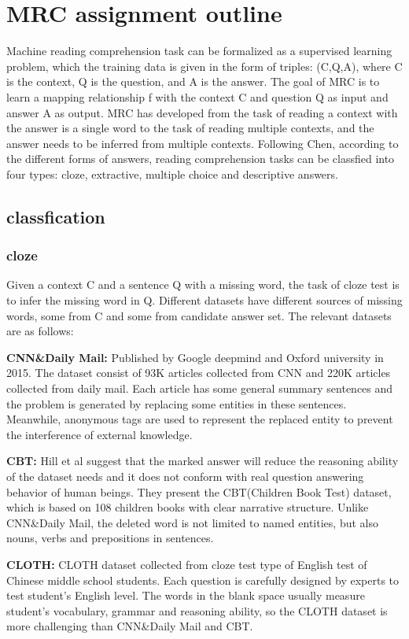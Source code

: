 \section{MRC assignment outline}
Machine reading comprehension task can be formalized as a supervised learning problem, which the training data 
is given in the form of triples: (C,Q,A), where C is the context, Q is the question, and A is the answer. 
The goal of MRC is to learn a mapping relationship f with the context C and question Q as input and answer A as output. 
MRC has developed from the task of reading a context with the answer is a single word to the task of reading 
multiple contexts, and the answer needs to be inferred from multiple contexts. 
Following Chen, according to the different forms of answers, reading comprehension tasks can be classfied into four types: 
cloze, extractive, multiple choice and descriptive answers.
\subsection{classfication}

\subsubsection{cloze}
Given a context C and a sentence Q with a missing word, the task of cloze test is to infer the missing word in Q. 
Different datasets have different sources of missing words, some from C and some from candidate answer set. 
The relevant datasets are as follows:

\noindent\textbf{CNN\&Daily Mail: }Published by Google deepmind and Oxford university in 2015. The dataset consist of 
93K articles collected from CNN and 220K articles collected from daily mail. Each article has some general summary sentences and the problem is generated 
by replacing some entities in these sentences. Meanwhile, anonymous tags are used to represent the replaced entity to 
prevent the interference of external knowledge.

\noindent\textbf{CBT: }Hill et al suggest that the marked answer will reduce the reasoning ability of 
the dataset needs and it does not conform with real question answering behavior of human beings. They present the CBT(Children Book Test) dataset, which is 
based on 108 children books with clear narrative structure. Unlike CNN\&Daily Mail, the deleted word is not limited to named entities, but also nouns, verbs and prepositions 
in sentences.

\noindent\textbf{CLOTH: }CLOTH dataset collected from cloze test type of English test of Chinese middle school students. Each question is carefully designed by experts 
to test student's English level. The words in the blank space usually measure student's vocabulary, grammar and reasoning ability, so the CLOTH dataset is more challenging than 
CNN\&Daily Mail and CBT.

